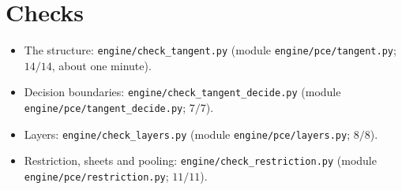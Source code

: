\documentclass[11pt]{article}
\theoremstyle{definition}\newtheorem{definition}[theorem]{Definition}\newtheorem{remark}[theorem]{Remark}\newtheorem{example}[theorem]{Example}
\begin{document}
\section*{Checks}
\begin{sloppypar}
\begin{itemize}
\item The structure: \texttt{engine/check\_tangent.py} (module \texttt{engine/pce/tangent.py}; $14/14$, about one minute).
\item Decision boundaries: \texttt{engine/check\_tangent\_decide.py} (module \texttt{engine/pce/tangent\_decide.py}; $7/7$).
\item Layers: \texttt{engine/check\_layers.py} (module \texttt{engine/pce/layers.py}; $8/8$).
\item Restriction, sheets and pooling: \texttt{engine/check\_restriction.py} (module \texttt{engine/pce/restriction.py}; $11/11$).
\end{itemize}
\end{sloppypar}
\end{document}
